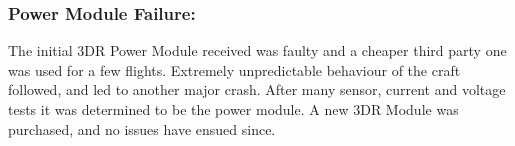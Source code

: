 \subsubsection*{Power Module Failure:}  The initial 3DR Power Module received was faulty and a cheaper third party one was used for a few flights. Extremely unpredictable behaviour of the craft followed, and led to another major crash. After many sensor, current and voltage tests it was determined to be the power module. A new 3DR Module was purchased, and no issues have ensued since.\\
